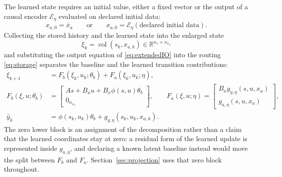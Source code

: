 \documentclass[11pt,a4paper]{article}
\newcommand{\R}{\mathbb R}
\newcommand{\col}{\operatorname{col}}
\theoremstyle{remark}
\begin{document}
The learned state requires an initial value, either a fixed vector or the output of a causal
encoder \(\mathcal E_\eta\) evaluated on declared initial data:
\begin{equation*}
x_{a,0}=\bar x_a\qquad\text{or}\qquad x_{a,0}=\mathcal E_\eta(\text{declared initial data}).
\end{equation*}
Collecting the stored history and the learned state into the enlarged state
\begin{equation*}
\xi_k=\col(s_k,x_{a,k})\in\R^{n_s+n_{x_a}}
\end{equation*}
and substituting the output equation of \eqref{eq:extendedIO} into the routing \eqref{eq:storage}
separates the baseline and the learned transition contributions:
\begin{equation}\label{eq:extendedSS}
\boxed{\begin{aligned}
\xi_{k+1}&=F_b(\xi_k,u_k;\theta_b)+F_a(\xi_k,u_k;\eta),\\
F_b(\xi,u;\theta_b)&=\begin{bmatrix}As+B_uu+B_x\phi(s,u)\theta_b\\0_{n_{x_a}}\end{bmatrix},
\qquad
F_a(\xi,u;\eta)=\begin{bmatrix}B_xg_{y,\eta}(s,u,x_a)\\g_{a,\eta}(s,u,x_a)\end{bmatrix},\\
\hat y_k&=\phi(s_k,u_k)\theta_b+g_{y,\eta}(s_k,u_k,x_{a,k}).
\end{aligned}}
\end{equation}
The zero lower block is an assignment of the decomposition rather than a claim that the learned
coordinates stay at zero: a residual form of the learned update is represented inside
\(g_{a,\eta}\), and declaring a known latent baseline instead would move the split between
\(F_b\) and \(F_a\). Section~\ref{sec:projection} uses that zero block throughout.
\end{document}
